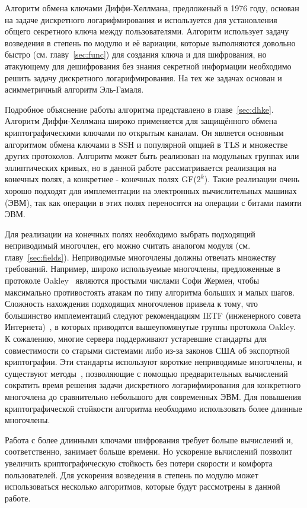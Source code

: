 \documentclass[times,specification,annotation]{itmo-student-thesis}
\begin{document}
Алгоритм обмена ключами Диффи-Хеллмана, предложеный в 1976 году, основан на задаче дискретного логарифмирования
и используется для установления общего секретного ключа между пользователями.
Алгоритм  использует задачу возведения в степень по модулю и её вариации, которые выполняются довольно быстро
(см. главу~\ref{sec:func}) для создания ключа и для шифрования, но атакующему для дешифрования без знания секретной
информации необходимо решить задачу дискретного логарифмирования.
На тех же задачах основан и асимметричный алгоритм Эль-Гамаля.

Подробное объяснение работы алгоритма представлено в главе~\ref{sec:dhke}.
Алгоритм Диффи-Хеллмана широко применяется для защищённого обмена криптографическими ключами
по открытым каналам.
Он является основным алгоритмом обмена ключами в SSH и популярной опцией в TLS и множестве других протоколов.
Алгоритм может быть реализован на модульных группах или эллиптических кривых, но в данной работе рассматривается
реализация на конечных полях, а конкретнее - конечных полях GF($2^k$).
Такие реализации очень хорошо подходят для имплементации на электронных вычислительных машинах (ЭВМ),
так как операции в этих полях переносятся на операции с битами памяти ЭВМ.

Для реализации на конечных полях необходимо выбрать подходящий неприводимый многочлен, его можно считать аналогом модуля (см. главу~\ref{sec:fields}).
Неприводимые многочлены должны отвечать множеству требований.
Например, широко используемые многочлены, предложенные в протоколе Oakley~\cite{rfc2412} являются простыми числами
Софи Жермен, чтобы максимально противостоять атакам по типу алгоритма больших и малых шагов.
Сложность нахождения подходящих многочленов привела к тому, что большинство имплементаций следуют рекомендациям
IETF (инженерного совета Интернета)~\cite{rfc7296}, в которых приводятся вышеупомянутые группы протокола Oakley.
К сожалению, многие сервера поддерживают устаревшие стандарты для совместимости со старыми системами либо
из-за законов США об экспортной криптографии.
Эти стандарты используют короткие неприводимые многочлены, и существуют методы~\cite{adr15},
позволяющие с помощью предварительных вычислений сократить время решения задачи дискретного логарифмирования для
конкретного многочлена до сравнительно небольшого для современных ЭВМ.
Для повышения криптографической стойкости алгоритма необходимо использовать более длинные многочлены.\par
Работа с более длинными ключами шифрования требует больше вычислений и, соответственно, занимает больше времени.
Но ускорение вычислений позволит увеличить криптографическую стойкость без потери скорости и комфорта пользователей.
Для ускорения возведения в степень по модулю может использоваться несколько алгоритмов, которые будут рассмотрены в
данной работе.
\end{document}
